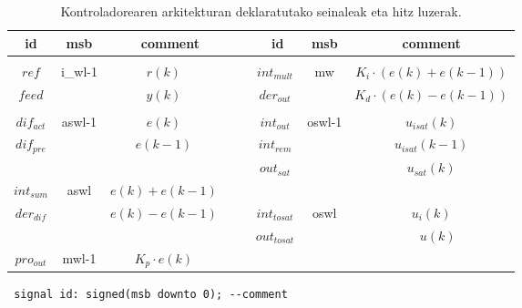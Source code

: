 \begin{table}[!htp]
\centering
\begin{tabular}{ccc|ccc}
\textbf{id} & \textbf{msb} & \textbf{comment} & $\quad$ \textbf{id} & \textbf{msb} & \textbf{comment}\\
\hline
\hline
&&&&&\\
$ref$ & \multirow{2}{*}{i\_wl-1} & $r(k)\quad$ & $\quad int_{mult}$ & \multirow{2}{*}{mw} & $K_i \cdot (e(k) + e(k-1))$ \\
$feed$ & & $y(k)\quad$ & $\quad der_{out}$ & & $K_d \cdot (e(k) - e(k-1))$ \\
&&&&&\\
$dif_{act}$ & \multirow{2}{*}{aswl-1} & $e(k)\quad$ & $\quad int_{out}$ & \multirow{3}{*}{oswl-1} & $u_{isat}(k)$ \\
$dif_{pre}$ & & $e(k-1)\quad$ & $\quad int_{rem}$ & & $u_{isat}(k-1)$ \\
&&& $\quad out_{sat}$ & & $u_{sat}(k)$ \\
$int_{sum}$ & \multirow{2}{*}{aswl} & $e(k) + e(k-1)\quad$ &&& \\
$der_{dif}$ & & $e(k) - e(k-1)\quad$ & $\quad int_{tosat}$ & \multirow{2}{*}{oswl} & $u_{i}(k)$ \\
&&&$\quad out_{tosat}$ & & $\quad u(k)$ \\
$pro_{out}$ & mwl-1	& $K_p \cdot e(k)\quad$ &&&\\
\end{tabular}

\begin{minipage}{.55\textwidth} \begin{lstlisting}
 signal id: signed(msb downto 0); --comment
\end{lstlisting} \end{minipage}
\caption{Kontroladorearen arkitekturan deklaratutako seinaleak eta hitz luzerak.}
\label{tab:vhdl_signals}
\end{table}
